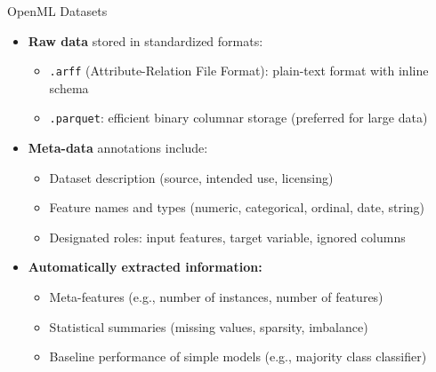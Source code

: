 \documentclass[11pt,compress,t,notes=noshow, xcolor=table]{beamer}
\begin{document}
\begin{vbframe}{OpenML Datasets}
\begin{itemize}
    \item \textbf{Raw data} stored in standardized formats:
    \begin{itemize}
        \item \texttt{.arff} (Attribute-Relation File Format): plain-text format with inline schema
        \item \texttt{.parquet}: efficient binary columnar storage (preferred for large data)
    \end{itemize}
    \item \textbf{Meta-data} annotations include:
\begin{itemize}
        \item Dataset description (source, intended use, licensing)
        \item Feature names and types (numeric, categorical, ordinal, date, string)
        \item Designated roles: input features, target variable, ignored columns
    \end{itemize}
\item \textbf{Automatically extracted information:}
    \begin{itemize}
        \item Meta-features (e.g., number of instances, number of features)
        \item Statistical summaries (missing values, sparsity, imbalance)
        \item Baseline performance of simple models (e.g., majority class classifier)
    \end{itemize}
\end{itemize}
\end{vbframe}
\end{document}
